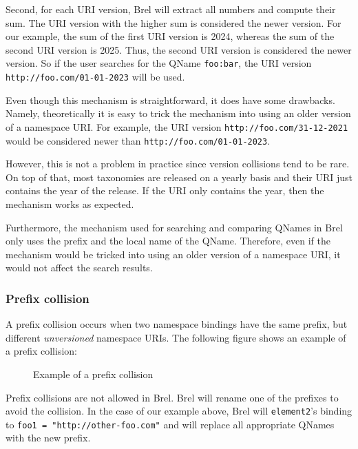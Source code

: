 Second, for each URI version, Brel will extract all numbers and compute their sum. The URI version with the higher sum is considered the newer version.
For our example, the sum of the first URI version is 2024, whereas the sum of the second URI version is 2025. 
Thus, the second URI version is considered the newer version. 
So if the user searches for the QName \texttt{foo:bar}, the URI version \texttt{http://foo.com/01-01-2023} will be used.

Even though this mechanism is straightforward, it does have some drawbacks. 
Namely, theoretically it is easy to trick the mechanism into using an older version of a namespace URI.
For example, the URI version \texttt{http://foo.com/31-12-2021} would be considered newer than \texttt{http://foo.com/01-01-2023}.

However, this is not a problem in practice since version collisions tend to be rare.
On top of that, most taxonomies are released on a yearly basis and their URI just contains the year of the release.
If the URI only contains the year, then the mechanism works as expected.

Furthermore, the mechanism used for searching and comparing QNames in Brel only uses the prefix and the local name of the QName.
Therefore, even if the mechanism would be tricked into using an older version of a namespace URI, it would not affect the search results.

\subsubsection{Prefix collision}

A prefix collision occurs when two namespace bindings have the same prefix, but different \textit{unversioned} namespace URIs.
The following figure shows an example of a prefix collision:

\begin{figure}[H]
    \caption{Example of a prefix collision}
    \label{fig:prefix_collision_example}
\end{figure}

Prefix collisions are not allowed in Brel. Brel will rename one of the prefixes to avoid the collision.
In the case of our example above, Brel will \texttt{element2}'s binding to \texttt{foo1 = "http://other-foo.com"} and will replace all appropriate QNames with the new prefix.

